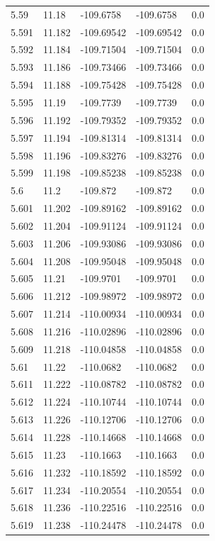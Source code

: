 \begin{tabular}{lllll}
5.59 & 11.18 & -109.6758 & -109.6758 & 0.0 \\
5.591 & 11.182 & -109.69542 & -109.69542 & 0.0 \\
5.592 & 11.184 & -109.71504 & -109.71504 & 0.0 \\
5.593 & 11.186 & -109.73466 & -109.73466 & 0.0 \\
5.594 & 11.188 & -109.75428 & -109.75428 & 0.0 \\
5.595 & 11.19 & -109.7739 & -109.7739 & 0.0 \\
5.596 & 11.192 & -109.79352 & -109.79352 & 0.0 \\
5.597 & 11.194 & -109.81314 & -109.81314 & 0.0 \\
5.598 & 11.196 & -109.83276 & -109.83276 & 0.0 \\
5.599 & 11.198 & -109.85238 & -109.85238 & 0.0 \\
5.6 & 11.2 & -109.872 & -109.872 & 0.0 \\
5.601 & 11.202 & -109.89162 & -109.89162 & 0.0 \\
5.602 & 11.204 & -109.91124 & -109.91124 & 0.0 \\
5.603 & 11.206 & -109.93086 & -109.93086 & 0.0 \\
5.604 & 11.208 & -109.95048 & -109.95048 & 0.0 \\
5.605 & 11.21 & -109.9701 & -109.9701 & 0.0 \\
5.606 & 11.212 & -109.98972 & -109.98972 & 0.0 \\
5.607 & 11.214 & -110.00934 & -110.00934 & 0.0 \\
5.608 & 11.216 & -110.02896 & -110.02896 & 0.0 \\
5.609 & 11.218 & -110.04858 & -110.04858 & 0.0 \\
5.61 & 11.22 & -110.0682 & -110.0682 & 0.0 \\
5.611 & 11.222 & -110.08782 & -110.08782 & 0.0 \\
5.612 & 11.224 & -110.10744 & -110.10744 & 0.0 \\
5.613 & 11.226 & -110.12706 & -110.12706 & 0.0 \\
5.614 & 11.228 & -110.14668 & -110.14668 & 0.0 \\
5.615 & 11.23 & -110.1663 & -110.1663 & 0.0 \\
5.616 & 11.232 & -110.18592 & -110.18592 & 0.0 \\
5.617 & 11.234 & -110.20554 & -110.20554 & 0.0 \\
5.618 & 11.236 & -110.22516 & -110.22516 & 0.0 \\
5.619 & 11.238 & -110.24478 & -110.24478 & 0.0 \\

\end{tabular}
